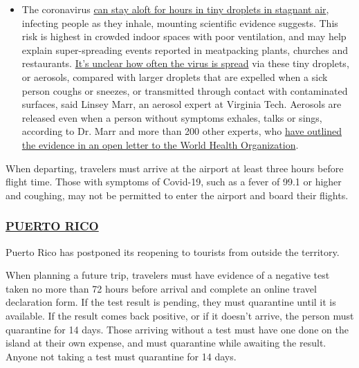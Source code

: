 \begin{itemize}
  \begin{itemize}
  \tightlist
  \item
    The coronavirus
    \href{https://www.nytimes3xbfgragh.onion/2020/07/04/health/239-experts-with-one-big-claim-the-coronavirus-is-airborne.html?action=click\&pgtype=Article\&state=default\&region=MAIN_CONTENT_3\&context=storylines_faq}{can
    stay aloft for hours in tiny droplets in stagnant air}, infecting
    people as they inhale, mounting scientific evidence suggests. This
    risk is highest in crowded indoor spaces with poor ventilation, and
    may help explain super-spreading events reported in meatpacking
    plants, churches and restaurants.
    \href{https://www.nytimes3xbfgragh.onion/2020/07/06/health/coronavirus-airborne-aerosols.html?action=click\&pgtype=Article\&state=default\&region=MAIN_CONTENT_3\&context=storylines_faq}{It's
    unclear how often the virus is spread} via these tiny droplets, or
    aerosols, compared with larger droplets that are expelled when a
    sick person coughs or sneezes, or transmitted through contact with
    contaminated surfaces, said Linsey Marr, an aerosol expert at
    Virginia Tech. Aerosols are released even when a person without
    symptoms exhales, talks or sings, according to Dr. Marr and more
    than 200 other experts, who
    \href{https://academic.oup.com/cid/article/doi/10.1093/cid/ciaa939/5867798}{have
    outlined the evidence in an open letter to the World Health
    Organization}.
  \end{itemize}
\end{itemize}

When departing, travelers must arrive at the airport at least three
hours before flight time. Those with symptoms of Covid-19, such as a
fever of 99.1 or higher and coughing, may not be permitted to enter the
airport and board their flights.

\hypertarget{puerto-rico}{%
\subsubsection{\texorpdfstring{\href{https://www.discoverpuertorico.com/info/travel-advisory}{PUERTO
RICO}}{PUERTO RICO}}\label{puerto-rico}}

Puerto Rico has postponed its reopening to tourists from outside the
territory.

When planning a future trip, travelers must have evidence of a negative
test taken no more than 72 hours before arrival and complete an online
travel declaration form. If the test result is pending, they must
quarantine until it is available. If the result comes back positive, or
if it doesn't arrive, the person must quarantine for 14 days. Those
arriving without a test must have one done on the island at their own
expense, and must quarantine while awaiting the result. Anyone not
taking a test must quarantine for 14 days.

